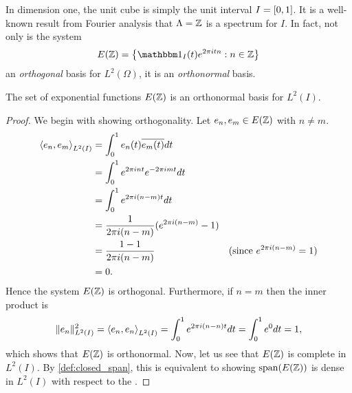 \documentclass[../thesis.tex]{subfiles}
\begin{document}
In dimension one, the unit cube is simply the unit interval $I=[0,1]$. It is a well-known result from Fourier analysis that $\Lambda = \mathbb{Z}$ is a spectrum for $I$. In fact, not only is the system
\begin{equation*}
    E(\Z) = \braqMed{\indicator{I}{t} e^{2\pi i t n} : n \in \Z}
\end{equation*} 
an \emph{orthogonal} basis for $L^2(\Omega)$, it is an \emph{orthonormal} basis.
\begin{theorem}\label{lem:exp_onb_onedim}
    The set of exponential functions $E(\mathbb{Z})$ is an orthonormal basis for $L^2(I)$.
\end{theorem}
\begin{proof}
    We begin with showing orthogonality. Let $e_{n}, e_{m} \in E(\mathbb{Z})$ with $n \neq m$. %
    \begin{align}\label{eq:orthog_one_dim_req}
        \left \langle e_{n},e_{m}  \right \rangle_{L^2(I)} &= \int_0^1 e_{n}(t)\overline{e_{m}(t)} dt \nonumber\\ 
        &= \int_0^1 e^{2 \pi i {n}t} e^{-2 \pi i {m}t} dt \nonumber\\
        &= \int_0^1 e^{2 \pi i (n-m)t} dt \nonumber\\
        &=\frac{1}{2 \pi i (n-m)} (e^{2 \pi i (n - m)} -1) \\
        &=\frac{1-1}{2 \pi i (n-m)} & (\text{since } e^{2 \pi i (n-m)} = 1) \nonumber\\
        &= 0 \nonumber.
    \end{align}
    Hence the system $E(\mathbb{Z})$ is orthogonal. Furthermore, if $n =m$ then the inner product is
    \begin{align*}\label{eq:exp_norm_one}
        \| e_n \|^2_{L^2(I)} 
        = \left \langle e_{n},e_{n}  \right \rangle_{L^2(I)} 
        = \int_0^1 e^{2 \pi i (n-n)t} dt
        = \int_0^1 e^{0} dt = 1,
    \end{align*}
    which shows that $E(\mathbb{Z})$ is orthonormal. Now, let us see that $E(\mathbb{Z})$ is complete in $L^2(I)$. By \cref{def:closed_span}, this is equivalent to showing $\operatorname{span}(E(\mathbb{Z}))$ is dense in $L^2(I)$ with respect to the \Ltwonorm. 

\end{proof}
\end{document}
